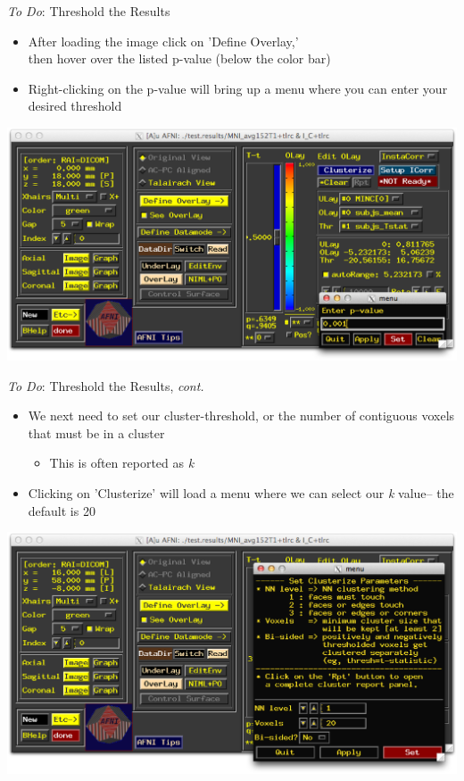 \documentclass[t,12pt]{beamer}
\begin{document}
\begin{frame}{\emph{To Do}: Threshold the Results}
\vspace{10pt}
\begin{itemize}
\setlength\itemsep{1em}
\item After loading the image click on 'Define Overlay,' \\ then hover over the listed p-value (below the color bar)
\item Right-clicking on the p-value will bring up a menu where you can enter your desired threshold
\end{itemize}
\vspace{4pt}
\centering
\includegraphics[width=.65\textwidth]{images/set_thresh.png}
\end{frame}

\begin{frame}{\emph{To Do}: Threshold the Results, \textit{cont.}}
\vspace{10pt}
\begin{itemize}
\setlength\itemsep{1em}
\item We next need to set our cluster-threshold, or the number of contiguous voxels that must be in a cluster
\vspace{4pt}
\begin{itemize}
\item This is often reported as \textit{k}
\end{itemize}
\item Clicking on 'Clusterize' will load a menu where we can select our \textit{k} value-- the default is 20
\end{itemize}
\vspace{4pt}
\centering
\includegraphics[width=.65\textwidth]{images/clusterize.png}
\end{frame}
\end{document}
